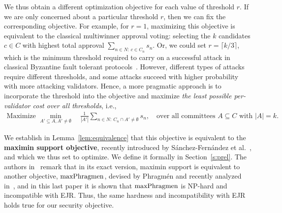 We thus obtain a different optimization objective for each value of threshold $r$. 
If we are only concerned about a particular threshold $r$, then we can fix the corresponding objective. 
For example, for $r=1$, maximizing this objective is equivalent to the classical multiwinner approval voting: selecting the $k$ candidates $c\in C$ with highest total approval $\sum_{n\in N: \ c\in C_n} s_n$. 
Or, we could set $r=\lceil k/3\rceil$, which is the minimum threshold required to carry on a successful attack in classical Byzantine fault tolerant protocols~\cite{pease1980reaching}. 
However, different types of attacks require different thresholds, and some attacks succeed with higher probability with more attacking validators. Hence, a more pragmatic approach is to incorporate the threshold into the objective and maximize \emph{the least possible per-validator cost over all thresholds}, i.e.,  
\begin{align}\label{eq:security}
    \text{Maximize } \min_{A'\subseteq A, A'\neq \emptyset} \quad \frac{1}{|A'|} \sum_{n\in N: \ C_n\cap A' \neq \emptyset} s_n, \quad \text{over all committees $A\subseteq C$ with $|A|=k$}.
\end{align}

We establish in Lemma~\ref{lem:equivalence} that this objective is equivalent to the \textbf{maximin support objective}, recently introduced by Sánchez-Fernández et al.~\cite{sanchez2016maximin}, and which we thus set to optimize. 
We define it formally in Section~\ref{s:prel}.
The authors in~\cite{sanchez2016maximin} remark that in its exact version, maximin support is equivalent to another objective, $\operatorname{maxPhragmen}$, devised by Phragm\'{e}n and recently analyzed in~\cite{brill2017phragmen}, and in this last paper it is shown that $\operatorname{maxPhragmen}$ is NP-hard and incompatible with EJR. 
Thus, the same hardness and incompatibility with EJR holds true for our security objective. 

